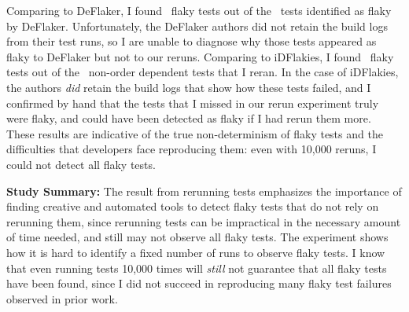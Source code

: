 Comparing to DeFlaker, I found ~flaky tests out of the ~tests identified as flaky by DeFlaker.
Unfortunately, the DeFlaker authors did not retain the build logs from their test runs, so I are unable to diagnose why those tests appeared as flaky to DeFlaker but not to our reruns.
Comparing to iDFlakies, I found \idflakiesCommonFlaky~flaky tests out of the \idflakiesRerunFlaky~non-order dependent tests that I reran.
In the case of iDFlakies, the authors \emph{did} retain the build logs that show how these tests failed, and I confirmed by hand that the tests that I missed in our rerun experiment truly were flaky, and could have been detected as flaky if I had rerun them more.
These results are indicative of the true non-determinism of flaky tests and the difficulties that developers face reproducing them: even with 10,000 reruns, I could not detect all flaky tests.


\textbf{Study Summary:} 
The result from rerunning tests emphasizes the importance of finding creative and automated tools to detect flaky tests that do not rely on rerunning them, since rerunning tests can be impractical in the necessary amount of time needed, and still may not observe all flaky tests. The experiment shows how it is hard to identify a fixed number of runs to observe flaky tests. I know that even running tests 10,000 times will \emph{still} not guarantee that all flaky tests have been found, since I did not succeed in reproducing many flaky test failures observed in prior work.
